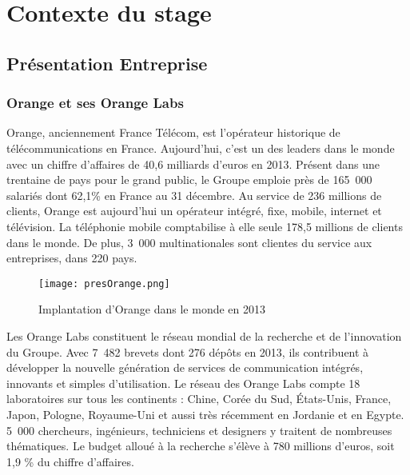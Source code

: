 \documentclass[11pt,oneside]{book}
\begin{document}
	
	\mainmatter
	
	\chapter{Contexte du stage}

		\section{Présentation Entreprise}
			\subsection{Orange et ses Orange Labs}
			
			Orange, anciennement France Télécom, est l'opérateur historique de télécommunications en France. Aujourd'hui, c'est un des leaders dans le monde avec un chiffre d'affaires de 40,6 milliards d'euros en 2013. Présent dans une trentaine de pays pour le grand public, le Groupe emploie près de 165~000 salariés dont 62,1\% en France au 31 décembre. Au service de 236 millions de clients, Orange est aujourd'hui un opérateur intégré, fixe, mobile, internet et télévision. La téléphonie mobile comptabilise à elle seule 178,5 millions de clients dans le monde. De plus, 3~000 multinationales sont clientes du service aux entreprises, dans 220 pays.
						 
	\begin{figure}[!h]
		\begin{center}
			\label{presOrange}
			\texttt{[image: presOrange.png]}
			\caption{Implantation d'Orange dans le monde en 2013}
		\end{center}
		
	\end{figure}

	Les Orange Labs constituent le réseau mondial de la recherche et de l'innovation du Groupe. Avec 7~482 brevets dont 276 dépôts en 2013, ils contribuent à développer la nouvelle génération de services de communication intégrés, innovants et simples d'utilisation. Le réseau des Orange Labs compte 18 laboratoires sur tous les continents : Chine, Corée du Sud, États-Unis, France, Japon, Pologne, Royaume-Uni et aussi très récemment en Jordanie et en Egypte. 5~000 chercheurs, ingénieurs, techniciens et designers y traitent de nombreuses thématiques. Le budget alloué à la recherche s'élève à 780 millions d'euros, soit 1,9 \% du chiffre d'affaires. 
			
\end{document}
